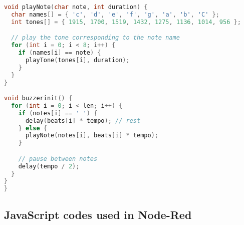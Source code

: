\begin{lstlisting}[language=C++]
void playNote(char note, int duration) {
  char names[] = { 'c', 'd', 'e', 'f', 'g', 'a', 'b', 'C' };
  int tones[] = { 1915, 1700, 1519, 1432, 1275, 1136, 1014, 956 };

  // play the tone corresponding to the note name
  for (int i = 0; i < 8; i++) {
    if (names[i] == note) {
      playTone(tones[i], duration);
    }
  }
}

void buzzerinit() {
  for (int i = 0; i < len; i++) {
    if (notes[i] == ' ') {
      delay(beats[i] * tempo); // rest
    } else {
      playNote(notes[i], beats[i] * tempo);
    }

    // pause between notes
    delay(tempo / 2); 
  }
}
}
\end{lstlisting}

\subsection{JavaScript codes used in Node-Red}